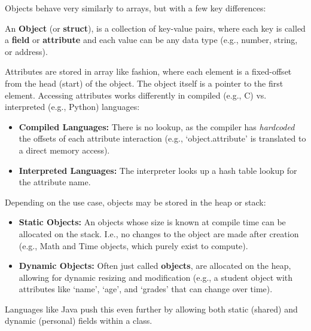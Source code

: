 \newpage

\noindent
Objects behave very similarly to arrays, but with a few key differences:
\begin{Def}

    An \textbf{Object} (or \textbf{struct}), is a collection of key-value pairs, 
    where each key is called a \textbf{field} or \textbf{attribute} and each value can be any data type (e.g., number, string, or address).

    Attributes are stored in array like fashion, where each element is a fixed-offset from the head (start) of the object.
    The object itself is a pointer to the first element. Accessing attributes works differently in compiled (e.g., C) vs. interpreted (e.g., Python) languages:
    \begin{itemize}
        \item \textbf{Compiled Languages:} There is no lookup, as the compiler has \emph{hardcoded} the offsets of each attribute interaction (e.g., `object.attribute' is translated to a direct memory access).
        \item \textbf{Interpreted Languages:} The interpreter looks up a hash table lookup for the attribute name.
    \end{itemize}

    \noindent
    Depending on the use case, objects may be stored in the heap or stack:
    \begin{itemize}
        \item \textbf{Static Objects:} An objects whose size is known at compile time can be allocated on the stack. I.e., no changes 
        to the object are made after creation (e.g., Math and Time objects, which purely exist to compute).
        \item \textbf{Dynamic Objects:} Often just called \textbf{objects}, are allocated on the heap, allowing for dynamic resizing and modification (e.g.,
        a student object with attributes like `name', `age', and `grades' that can change over time).
    \end{itemize}

    \noindent
    Languages like Java push this even further by allowing both static (shared) and dynamic (personal) fields within a class.
\end{Def}


